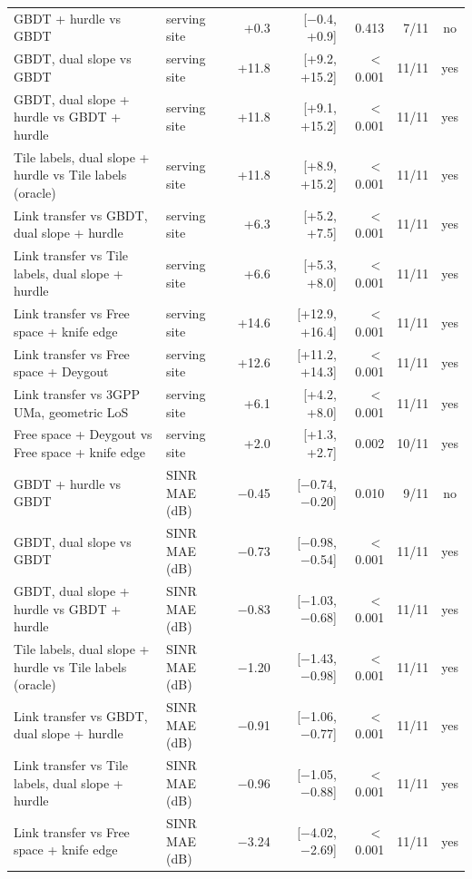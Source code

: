 \begin{tabular}{llrrrrc}
GBDT + hurdle vs GBDT & serving site & +0.3 & [\ensuremath{-}0.4, +0.9] & 0.413 & 7/11 & no \\
GBDT, dual slope vs GBDT & serving site & +11.8 & [+9.2, +15.2] & $<$0.001 & 11/11 & yes \\
GBDT, dual slope + hurdle vs GBDT + hurdle & serving site & +11.8 & [+9.1, +15.2] & $<$0.001 & 11/11 & yes \\
Tile labels, dual slope + hurdle vs Tile labels (oracle) & serving site & +11.8 & [+8.9, +15.2] & $<$0.001 & 11/11 & yes \\
Link transfer vs GBDT, dual slope + hurdle & serving site & +6.3 & [+5.2, +7.5] & $<$0.001 & 11/11 & yes \\
Link transfer vs Tile labels, dual slope + hurdle & serving site & +6.6 & [+5.3, +8.0] & $<$0.001 & 11/11 & yes \\
Link transfer vs Free space + knife edge & serving site & +14.6 & [+12.9, +16.4] & $<$0.001 & 11/11 & yes \\
Link transfer vs Free space + Deygout & serving site & +12.6 & [+11.2, +14.3] & $<$0.001 & 11/11 & yes \\
Link transfer vs 3GPP UMa, geometric LoS & serving site & +6.1 & [+4.2, +8.0] & $<$0.001 & 11/11 & yes \\
Free space + Deygout vs Free space + knife edge & serving site & +2.0 & [+1.3, +2.7] & 0.002 & 10/11 & yes \\
GBDT + hurdle vs GBDT & SINR MAE (dB) & \ensuremath{-}0.45 & [\ensuremath{-}0.74, \ensuremath{-}0.20] & 0.010 & 9/11 & no \\
GBDT, dual slope vs GBDT & SINR MAE (dB) & \ensuremath{-}0.73 & [\ensuremath{-}0.98, \ensuremath{-}0.54] & $<$0.001 & 11/11 & yes \\
GBDT, dual slope + hurdle vs GBDT + hurdle & SINR MAE (dB) & \ensuremath{-}0.83 & [\ensuremath{-}1.03, \ensuremath{-}0.68] & $<$0.001 & 11/11 & yes \\
Tile labels, dual slope + hurdle vs Tile labels (oracle) & SINR MAE (dB) & \ensuremath{-}1.20 & [\ensuremath{-}1.43, \ensuremath{-}0.98] & $<$0.001 & 11/11 & yes \\
Link transfer vs GBDT, dual slope + hurdle & SINR MAE (dB) & \ensuremath{-}0.91 & [\ensuremath{-}1.06, \ensuremath{-}0.77] & $<$0.001 & 11/11 & yes \\
Link transfer vs Tile labels, dual slope + hurdle & SINR MAE (dB) & \ensuremath{-}0.96 & [\ensuremath{-}1.05, \ensuremath{-}0.88] & $<$0.001 & 11/11 & yes \\
Link transfer vs Free space + knife edge & SINR MAE (dB) & \ensuremath{-}3.24 & [\ensuremath{-}4.02, \ensuremath{-}2.69] & $<$0.001 & 11/11 & yes \\

\end{tabular}
